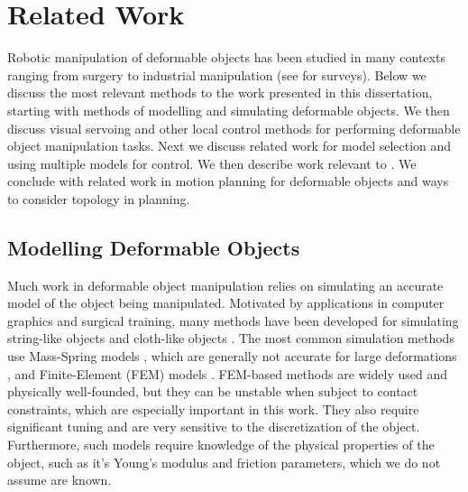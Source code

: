 \chapter{Related Work}


Robotic manipulation of deformable objects has been studied in many contexts ranging from surgery to industrial manipulation (see \cite{Khalil2010, Jimenez2012, Sanchez2018deformablesurvey} for surveys). Below we discuss the most relevant methods to the work presented in this dissertation, starting with methods of modelling and simulating deformable objects. We then discuss visual servoing and other local control methods for performing deformable object manipulation tasks. Next we discuss related work for model selection and using multiple models for control. We then describe work relevant to . We conclude with related work in motion planning for deformable objects and ways to consider topology in planning.


\section{Modelling Deformable Objects}

Much work in deformable object manipulation relies on simulating an accurate model of the object being manipulated. Motivated by applications in computer graphics and surgical training, many methods have been developed for simulating string-like objects \cite{Bergou2008, Rungjiratananon2011} and cloth-like objects \cite{Baraff1998, Goldenthal2007}. The most common simulation methods use Mass-Spring models \cite{Gibson1997, Essahbi2012}, which are generally not accurate for large deformations \cite{Maris2010}, and Finite-Element (FEM) models \cite{Muller2002, Irving2004, Kaufmann2008}. FEM-based methods are widely used and physically well-founded, but they can be unstable when subject to contact constraints, which are especially important in this work. They also require significant tuning and are very sensitive to the discretization of the object. Furthermore, such models require knowledge of the physical properties of the object, such as it's Young's modulus and friction parameters, which we do not assume are known.

